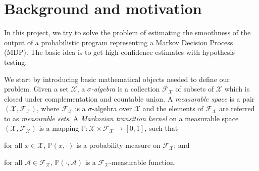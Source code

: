 \documentclass[11pt]{report}
\newcommand{\X}{\mathcal{X}}
\newcommand{\Y}{\mathcal{Y}}
\newcommand{\F}{\mathcal{F}}
\begin{document}
\section*{Background and motivation}
In this project, we try to solve the problem of estimating the smoothness of the output of a probabilistic program representing a Markov Decision Process (MDP). The basic idea is to get high-confidence estimates with hypothesis testing.

We start by introducing basic mathematical objects needed to define our problem. Given a set $\X$, a {\em $\sigma$-algebra} is a collection $\F_\X$ of subsets of $\X$ which is closed under complementation and countable union. A {\em measurable space\/} is a pair $(\X, \F_\X)$, where $\F_\X$ is a $\sigma$-algebra over $\X$ and the elements of $\F_\X$ are referred to as {\em measurable sets}.
A {\em Markovian transition kernel} on a measurable space $(\X, \F_\X)$ is  a mapping $\mathbb{P}:\X \times \F_\X \rightarrow [0, 1]$, such that \begin{inparaenum}[(i)] \item for all $x \in \X$, $\mathbb{P}(x, \cdot)$ is a probability measure on $\F_\X$; and \item for all $\mathcal{A} \in \F_\X$, $\mathbb{P}(\cdot, \mathcal{A})$ is a $\F_\X$-measurable function. \end{inparaenum}
\end{document}
